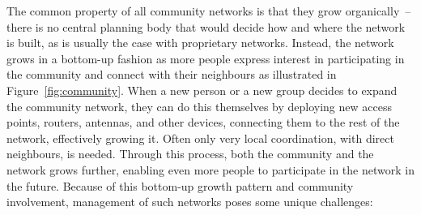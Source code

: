 \documentclass[5p,sort&compress]{elsarticle}
\begin{document}
The common property of all community networks is that they grow organically~-- there is no central planning body that would decide how and where the network is built, as is usually the case with proprietary networks.
Instead, the network grows in a bottom-up fashion as more people express interest in participating in the community and connect with their neighbours as illustrated in Figure~\ref{fig:community}.
When a new person or a new group decides to expand the community network, they can do this themselves by deploying new access points, routers, antennas, and other devices, connecting them to the rest of the network, effectively growing it.
Often only very local coordination, with direct neighbours, is needed.
Through this process, both the community and the network grows further, enabling even more people to participate in the network in the future.
Because of this bottom-up growth pattern and community involvement, management of such networks poses some unique challenges:
\end{document}
